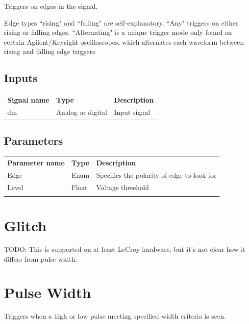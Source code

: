 Triggers on edges in the signal.

Edge types ``rising" and ``falling" are self-explanatory. ``Any" triggers on either rising or falling edges.
``Alternating" is a unique trigger mode only found on certain Agilent/Keysight oscilloscopes, which alternates each
waveform between rising and falling edge triggers.

\subsection{Inputs}

\begin{tabularx}{16cm}{llX}
\thickhline
\textbf{Signal name} & \textbf{Type} & \textbf{Description} \\
\thickhline
din & Analog or digital & Input signal \\
\end{tabularx}

\subsection{Parameters}

\begin{tabularx}{16cm}{llX}
\thickhline
\textbf{Parameter name} & \textbf{Type} & \textbf{Description} \\
\thickhline
Edge & Enum & Specifies the polarity of edge to look for\\
\thickhline
Level & Float & Voltage threshold\\
\thickhline
\end{tabularx}

\section{Glitch}

TODO: This is supported on at least LeCroy hardware, but it's not clear how it differs from pulse width.


\section{Pulse Width}

Triggers when a high or low pulse meeting specified width criteria is seen.

